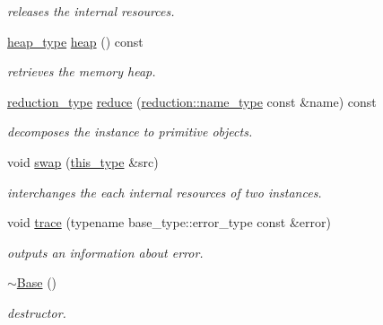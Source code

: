 \begin{DoxyCompactItemize}
\begin{DoxyCompactList}\small\item\em releases the internal resources. \end{DoxyCompactList}\item 
\hypertarget{classhryky_1_1parser_1_1_base_ade0723cedb648d9850423cc04fe4bdcf}{\hyperlink{classhryky_1_1memory_1_1heap_1_1_base}{heap\-\_\-type} \hyperlink{classhryky_1_1parser_1_1_base_ade0723cedb648d9850423cc04fe4bdcf}{heap} () const }\label{classhryky_1_1parser_1_1_base_ade0723cedb648d9850423cc04fe4bdcf}

\begin{DoxyCompactList}\small\item\em retrieves the memory heap. \end{DoxyCompactList}\item 
\hypertarget{classhryky_1_1parser_1_1_base_a2809ad5f75abd2266e6804e90094bc05}{\hyperlink{namespacehryky_a343a9a4c36a586be5c2693156200eadc}{reduction\-\_\-type} \hyperlink{classhryky_1_1parser_1_1_base_a2809ad5f75abd2266e6804e90094bc05}{reduce} (\hyperlink{namespacehryky_1_1reduction_ac686c30a4c8d196bbd0f05629a6b921f}{reduction\-::name\-\_\-type} const \&name) const }\label{classhryky_1_1parser_1_1_base_a2809ad5f75abd2266e6804e90094bc05}

\begin{DoxyCompactList}\small\item\em decomposes the instance to primitive objects. \end{DoxyCompactList}\item 
\hypertarget{classhryky_1_1parser_1_1_base_ab2b137d16fbe40d839ee136bd5304cab}{void \hyperlink{classhryky_1_1parser_1_1_base_ab2b137d16fbe40d839ee136bd5304cab}{swap} (\hyperlink{classhryky_1_1parser_1_1_base_af5836311fb3f235ddc6e08809ca2ad68}{this\-\_\-type} \&src)}\label{classhryky_1_1parser_1_1_base_ab2b137d16fbe40d839ee136bd5304cab}

\begin{DoxyCompactList}\small\item\em interchanges the each internal resources of two instances. \end{DoxyCompactList}\item 
\hypertarget{classhryky_1_1parser_1_1_base_a28bfa66d197bcf4babb3806bcf3abafa}{void \hyperlink{classhryky_1_1parser_1_1_base_a28bfa66d197bcf4babb3806bcf3abafa}{trace} (typename base\-\_\-type\-::error\-\_\-type const \&error)}\label{classhryky_1_1parser_1_1_base_a28bfa66d197bcf4babb3806bcf3abafa}

\begin{DoxyCompactList}\small\item\em outputs an information about error. \end{DoxyCompactList}\item 
\hyperlink{classhryky_1_1parser_1_1_base_a722da881b6c70cfcbde9243abcfbf334}{$\sim$\-Base} ()
\begin{DoxyCompactList}\small\item\em destructor. \end{DoxyCompactList}\end{DoxyCompactItemize}
